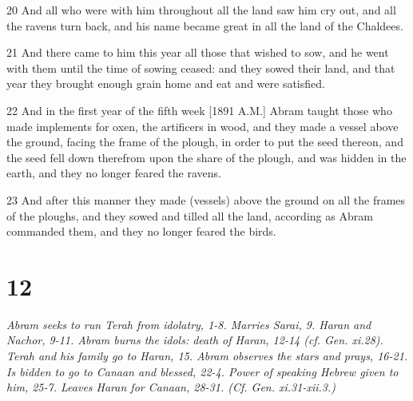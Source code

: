 \par 20 And all who were with him throughout all the land saw him cry out, and all the ravens turn back, and his name became great in all the land of the Chaldees.
\par 21 And there came to him this year all those that wished to sow, and he went with them until the time of sowing ceased: and they sowed their land, and that year they brought enough grain home and eat and were satisfied.
\par 22 And in the first year of the fifth week [1891 A.M.] Abram taught those who made implements for oxen, the artificers in wood, and they made a vessel above the ground, facing the frame of the plough, in order to put the seed thereon, and the seed fell down therefrom upon the share of the plough, and was hidden in the earth, and they no longer feared the ravens.
\par 23 And after this manner they made (vessels) above the ground on all the frames of the ploughs, and they sowed and tilled all the land, according as Abram commanded them, and they no longer feared the birds.

\chapter{12}

\par \textit{Abram seeks to run Terah from idolatry, 1-8. Marries Sarai, 9. Haran and Nachor, 9-11. Abram burns the idols: death of Haran, 12-14 (cf. Gen. xi.28). Terah and his family go to Haran, 15. Abram observes the stars and prays, 16-21. Is bidden to go to Canaan and blessed, 22-4. Power of speaking Hebrew given to him, 25-7. Leaves Haran for Canaan, 28-31. (Cf. Gen. xi.31-xii.3.)}

